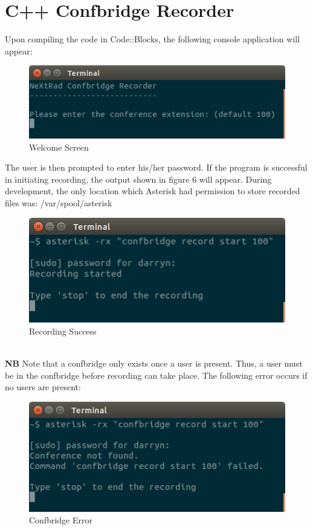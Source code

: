 \documentclass[a4paper,11pt]{report}
\begin{document}
\section{C++ Confbridge Recorder}
Upon compiling the code in Code::Blocks, the following console application will appear:
\begin{figure}[h]
  \begin{center}
    \includegraphics[scale = 0.5]{welcome}
    \caption{Welcome Screen}
  \end{center}
\end{figure}
\newpage 
The user is then prompted to enter his/her password. If the program is successful in initiating recording, the output shown in figure 6 will appear. During development, the only location which Asterisk had permission to store recorded files was: /var/spool/asterisk
\begin{figure}[h]
  \begin{center}
    \includegraphics[scale = 0.5]{start}
    \caption{Recording Success}
  \end{center}
\end{figure}\\
\textbf{NB} Note that a confbridge only exists once a user is present. Thus, a user must be in the confbridge before recording can take place. The following error occurs if no users are present:
\begin{figure}[h]
  \begin{center}
    \includegraphics[scale = 0.5]{confbridge_error}
    \caption{Confbridge Error}
  \end{center}
\end{figure}\\
\end{document}
